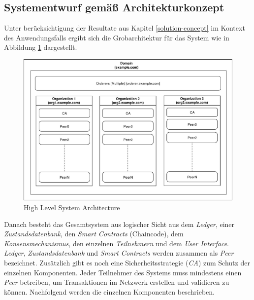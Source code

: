 \subsection{Systementwurf gemäß Architekturkonzept}
Unter berücksichtigung der Resultate aus Kapitel \ref{solution-concept} im Kontext des Anwendungsfalls ergibt sich die Grobarchitektur für das System wie in Abbildung \ref{fig:high-level-architecture} dargestellt.

\begin{figure}[H]
	\centering
	\includegraphics[width=1\linewidth]{pictures/hyperledger-fabric-architecture}
	\caption[High Level System Architecture]{High Level System Architecture}
	\label{fig:high-level-architecture}
\end{figure}

Danach besteht das Gesamtsystem aus logischer Sicht aus dem \textit{Ledger}, einer \textit{Zustandsdatenbank}, den \textit{Smart Contracts} (Chaincode), dem \textit{Konsensmechanismus}, den einzelnen \textit{Teilnehmern} und dem \textit{User Interface}. \textit{Ledger}, \textit{Zustandsdatenbank} und \textit{Smart Contracts} werden zusammen als \textit{Peer} bezeichnet. Zusätzlich gibt es noch eine Sicherheitsstrategie (\textit{CA}) zum Schutz der einzelnen Komponenten. Jeder Teilnehmer des Systems muss mindestens einen \textit{Peer} betreiben, um Transaktionen im Netzwerk erstellen und validieren zu können. Nachfolgend werden die einzelnen Komponenten beschrieben.

